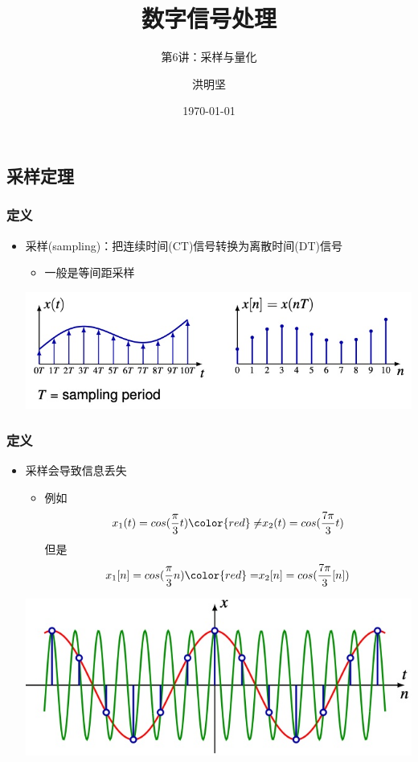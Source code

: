 \documentclass[CJKutf8,dvipsnames,table]{beamer}
\title{数字信号处理}
\subtitle{第6讲：采样与量化}
\author{洪明坚}
\institute{重庆大学软件学院}
\date{\today}
\newif\ifxetexorluatex %
\begin{document}
\ifxetexorluatex\else
\begin{CJK*}{UTF8}{song}
\fi


  \frame{\titlepage}
  
  \section{采样定理}
  
  \begin{frame}
    \frametitle{定义}
    \begin{itemize}
	\item 采样(sampling)：把连续时间(CT)信号转换为离散时间(DT)信号
		\begin{itemize}
		\item 一般是等间距采样
		\end{itemize}
	\begin{center}
    \includegraphics[scale=.4]{sampling}	
	\end{center}
    \end{itemize}
  \end{frame}    
   
  \begin{frame}
    \frametitle{定义}
    \begin{itemize}
	\item 采样会导致信息丢失
		\begin{itemize}
		\item 例如
		\[
			x_1(t)=cos(\frac{\pi}{3}t) {\color{red} \neq} x_2(t)=cos(\frac{7\pi}{3}t) 
		\]
		但是
		\[
			x_1[n]=cos(\frac{\pi}{3}n) {\color{red} =} x_2[n]=cos(\frac{7\pi}{3}[n])
		\]
		\end{itemize}
	\begin{center}
    \includegraphics[scale=.4]{lossysampling}	
	\end{center}
	

\end{itemize}
\end{frame}
\end{CJK*}
\end{document}
